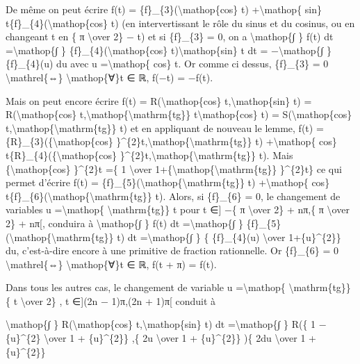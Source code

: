 \documentclass[]{article}
\begin{document}
De même on peut écrire f(t) = \{f\}\_\{3\}(\textbackslash{}mathop\{cos\}
t) +\textbackslash{}mathop\{ sin\}
t\{f\}\_\{4\}(\textbackslash{}mathop\{cos\} t) (en intervertissant le
rôle du sinus et du cosinus, ou en changeant t en \{ π
\textbackslash{}over 2\} − t) et si \{f\}\_\{3\} = 0, on a
\textbackslash{}mathop\{∫ \} f(t) dt =\textbackslash{}mathop\{∫ \}
\{f\}\_\{4\}(\textbackslash{}mathop\{cos\}
t)\textbackslash{}mathop\{sin\} t dt = −\textbackslash{}mathop\{∫ \}
\{f\}\_\{4\}(u) du avec u =\textbackslash{}mathop\{ cos\} t. Or comme ci
dessus, \{f\}\_\{3\} = 0 \textbackslash{}mathrel\{⇔\}
\textbackslash{}mathop\{∀\}t ∈ ℝ, f(−t) = −f(t).

Mais on peut encore écrire f(t) = R(\textbackslash{}mathop\{cos\}
t,\textbackslash{}mathop\{sin\} t) = R(\textbackslash{}mathop\{cos\}
t,\textbackslash{}mathop\{\textbackslash{}mathrm\{tg\}\}
t\textbackslash{}mathop\{cos\} t) = S(\textbackslash{}mathop\{cos\}
t,\textbackslash{}mathop\{\textbackslash{}mathrm\{tg\}\} t) et en
appliquant de nouveau le lemme, f(t) =
\{R\}\_\{3\}(\{\textbackslash{}mathop\{cos\}
\}\^{}\{2\}t,\textbackslash{}mathop\{\textbackslash{}mathrm\{tg\}\} t)
+\textbackslash{}mathop\{ cos\}
t\{R\}\_\{4\}(\{\textbackslash{}mathop\{cos\}
\}\^{}\{2\}t,\textbackslash{}mathop\{\textbackslash{}mathrm\{tg\}\} t).
Mais \{\textbackslash{}mathop\{cos\} \}\^{}\{2\}t =\{ 1
\textbackslash{}over
1+\{\textbackslash{}mathop\{\textbackslash{}mathrm\{tg\}\}
\}\^{}\{2\}t\} ce qui permet d'écrire f(t) =
\{f\}\_\{5\}(\textbackslash{}mathop\{\textbackslash{}mathrm\{tg\}\} t)
+\textbackslash{}mathop\{ cos\}
t\{f\}\_\{6\}(\textbackslash{}mathop\{\textbackslash{}mathrm\{tg\}\} t).
Alors, si \{f\}\_\{6\} = 0, le changement de variables u
=\textbackslash{}mathop\{ \textbackslash{}mathrm\{tg\}\} t pour t ∈{]}
−\{ π \textbackslash{}over 2\} + nπ,\{ π \textbackslash{}over 2\} +
nπ{[}, conduira à \textbackslash{}mathop\{∫ \} f(t) dt
=\textbackslash{}mathop\{∫ \}
\{f\}\_\{5\}(\textbackslash{}mathop\{\textbackslash{}mathrm\{tg\}\} t)
dt =\textbackslash{}mathop\{∫ \} \{ \{f\}\_\{4\}(u) \textbackslash{}over
1+\{u\}\^{}\{2\}\} du, c'est-à-dire encore à une primitive de fraction
rationnelle. Or \{f\}\_\{6\} = 0 \textbackslash{}mathrel\{⇔\}
\textbackslash{}mathop\{∀\}t ∈ ℝ, f(t + π) = f(t).

Dans tous les autres cas, le changement de variable u
=\textbackslash{}mathop\{ \textbackslash{}mathrm\{tg\}\} \{ t
\textbackslash{}over 2\} , t ∈{]}(2n − 1)π,(2n + 1)π{[} conduit à

\textbackslash{}mathop\{∫ \} R(\textbackslash{}mathop\{cos\}
t,\textbackslash{}mathop\{sin\} t) dt =\textbackslash{}mathop\{∫ \} R(\{
1 − \{u\}\^{}\{2\} \textbackslash{}over 1 + \{u\}\^{}\{2\}\} ,\{ 2u
\textbackslash{}over 1 + \{u\}\^{}\{2\}\} )\{ 2du \textbackslash{}over 1
+ \{u\}\^{}\{2\}\}
\end{document}

